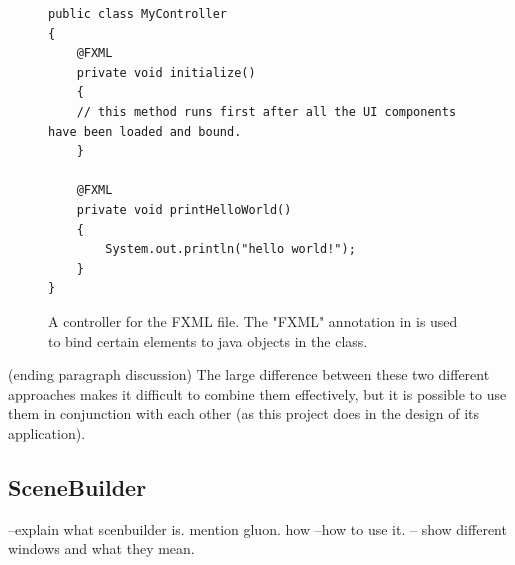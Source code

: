 \begin{figure}[th]
\centering
\begin{lstlisting}
public class MyController 
{
	@FXML
	private void initialize() 
	{
	// this method runs first after all the UI components have been loaded and bound.
	}
	
	@FXML
	private void printHelloWorld() 
	{
		System.out.println("hello world!");
	}
}
\end{lstlisting}
\caption{A controller for the FXML file. The "FXML" annotation in is used to bind certain elements to java objects in the class.}
\label{fig:simpleController}
\end{figure}






(ending paragraph discussion)
The large difference between these two different approaches makes it difficult to combine them effectively, but it is possible to use them in conjunction with each other (as this project does in the design of its application). 









\subsection{SceneBuilder}
--explain what scenbuilder is. mention gluon. how
--how to use it. 
-- show different windows and what they mean. 